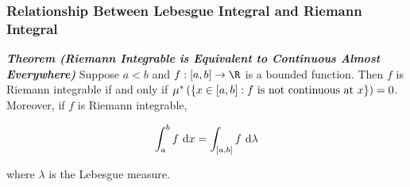 \documentclass[
]{article}
\begin{document}
\hypertarget{relationship-between-lebesgue-integral-and-riemann-integral}{%
\subsubsection{Relationship Between Lebesgue Integral and Riemann
Integral}\label{relationship-between-lebesgue-integral-and-riemann-integral}}

\emph{\textbf{Theorem (Riemann Integrable is Equivalent to Continuous
Almost Everywhere)}} Suppose \(a<b\) and \(f:\br{a,b}\to \R\) is a
bounded function. Then \(f\) is Riemann integrable if and only if
\(\mu^*\left(\left\{x\in\left[a,b\right]:f\text{ is not continuous at }x\right\}\right) = 0\).
Moreover, if \(f\) is Riemann integrable,

\[\int_a^bf\text{ d} x = \int_{\left[a,b\right]}f\text{ d} \lambda\]

where \(\lambda\) is the Lebesgue measure.
\end{document}
